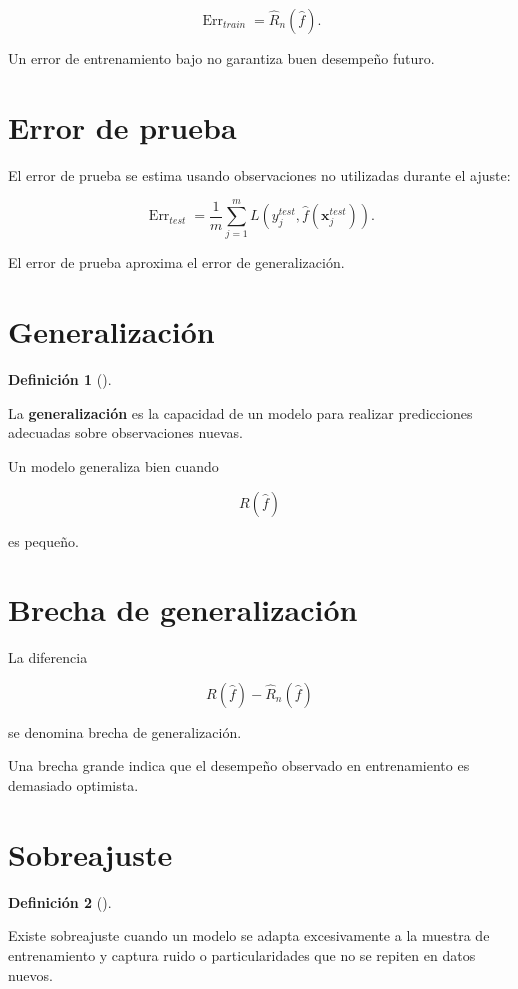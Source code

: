 \documentclass[
  spanish,
  11pt,
  letterpaper,
  DIV=11,
  numbers=noendperiod]{scrreprt}
\theoremstyle{definition}
\newtheorem{definition}{Definición}[chapter]
\theoremstyle{plain}
\theoremstyle{definition}
\theoremstyle{remark}
\begin{document}
\[
\operatorname{Err}_{train}
=
\widehat{R}_n(\widehat{f}).
\]

Un error de entrenamiento bajo no garantiza buen desempeño futuro.

\section{Error de prueba}\label{error-de-prueba}

El error de prueba se estima usando observaciones no utilizadas durante
el ajuste:

\[
\operatorname{Err}_{test}
=
\frac{1}{m}
\sum_{j=1}^{m}
L(
y_j^{test},
\widehat{f}(\mathbf{x}_j^{test})
).
\]

El error de prueba aproxima el error de generalización.

\section{Generalización}\label{generalizaciuxf3n}

\begin{definition}[]\protect\hypertarget{def-generalizacion}{}\label{def-generalizacion}

La \textbf{generalización} es la capacidad de un modelo para realizar
predicciones adecuadas sobre observaciones nuevas.

\end{definition}

Un modelo generaliza bien cuando

\[
R(\widehat{f})
\]

es pequeño.

\section{Brecha de generalización}\label{brecha-de-generalizaciuxf3n}

La diferencia

\[
R(\widehat{f})
-
\widehat{R}_n(\widehat{f})
\]

se denomina brecha de generalización.

Una brecha grande indica que el desempeño observado en entrenamiento es
demasiado optimista.

\section{Sobreajuste}\label{sobreajuste}

\begin{definition}[]\protect\hypertarget{def-sobreajuste}{}\label{def-sobreajuste}

Existe sobreajuste cuando un modelo se adapta excesivamente a la muestra
de entrenamiento y captura ruido o particularidades que no se repiten en
datos nuevos.

\end{definition}
\end{document}
